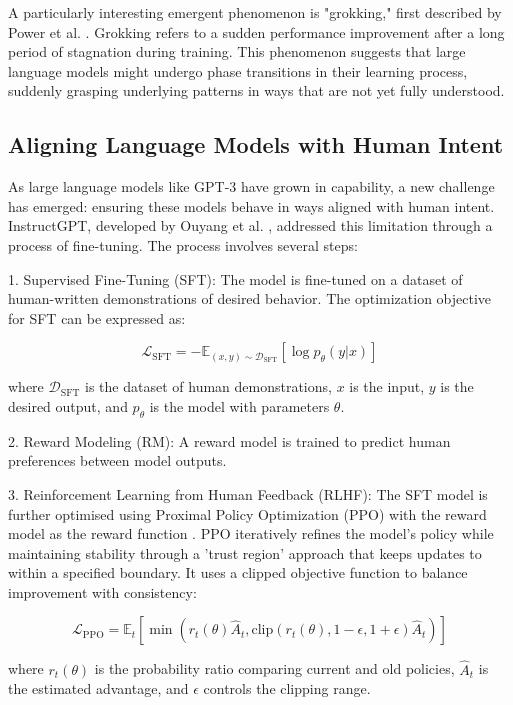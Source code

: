 \documentclass[a4paper, oneside]{discothesis}
\begin{document}
A particularly interesting emergent phenomenon is "grokking," first described by Power et al. \cite{power2022grokking}. Grokking refers to a sudden performance improvement after a long period of stagnation during training. This phenomenon suggests that large language models might undergo phase transitions in their learning process, suddenly grasping underlying patterns in ways that are not yet fully understood.

\subsection{Aligning Language Models with Human Intent}
As large language models like GPT-3 have grown in capability, a new challenge has emerged: ensuring these models behave in ways aligned with human intent. InstructGPT, developed by Ouyang et al. \cite{ouyang2022training}, addressed this limitation through a process of fine-tuning.
The process involves several steps:

1. Supervised Fine-Tuning (SFT): The model is fine-tuned on a dataset of human-written demonstrations of desired behavior. The optimization objective for SFT can be expressed as:

   \[\mathcal{L}_{\text{SFT}} = -\mathbb{E}_{(x,y)\sim \mathcal{D}_{\text{SFT}}}[\log p_\theta(y|x)]\]

   where $\mathcal{D}_{\text{SFT}}$ is the dataset of human demonstrations, $x$ is the input, $y$ is the desired output, and $p_\theta$ is the model with parameters $\theta$.

2. Reward Modeling (RM): A reward model is trained to predict human preferences between model outputs.

3. Reinforcement Learning from Human Feedback (RLHF): The SFT model is further optimised using Proximal Policy Optimization (PPO) 
with the reward model as the reward function \cite{schulman2017proximal}. PPO iteratively refines the model's policy while maintaining stability through a 'trust region' approach that keeps updates to within a specified boundary. It uses a clipped objective function to balance improvement with consistency:

   \[\mathcal{L}_{\text{PPO}} = \mathbb{E}_t[\min(r_t(\theta)\hat{A}_t, \text{clip}(r_t(\theta), 1-\epsilon, 1+\epsilon)\hat{A}_t)]\]

   where $r_t(\theta)$ is the probability ratio comparing current and old policies, $\hat{A}_t$ is the estimated advantage, and $\epsilon$ controls the clipping range.
\end{document}
